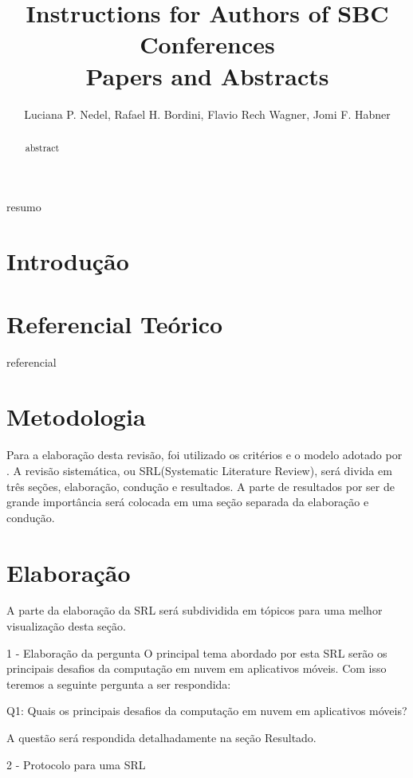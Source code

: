 \documentclass[12pt]{article}
\title{Instructions for Authors of SBC Conferences\\ Papers and Abstracts}
\author{Luciana P. Nedel\inst{1}, Rafael H. Bordini\inst{2}, Flavio Rech
  Wagner\inst{1}, Jomi F. Habner\inst{3} }
\begin{document}
 

\maketitle

\begin{abstract}
  abstract
\end{abstract}
     
\begin{resumo} 
  resumo
\end{resumo}


\section{Introdução}

\lipsum[1]

\section{Referencial Teórico}

  referencial

\section{Metodologia}

Para a elaboração desta revisão, foi utilizado os critérios e o modelo adotado por \cite{kitchenham2012}. A revisão sistemática, ou SRL(Systematic Literature Review), será divida em três seções, elaboração, condução e resultados. A parte de resultados por ser de grande importância será colocada em uma seção separada da elaboração e condução.

\section{Elaboração}
A parte da elaboração da SRL será subdividida em tópicos para uma melhor visualização desta seção.

1 - Elaboração da pergunta
O principal tema abordado por esta SRL serão os principais desafios da computação em nuvem em aplicativos móveis. Com isso teremos a seguinte pergunta a ser respondida:

Q1: Quais os principais desafios da computação em nuvem em aplicativos móveis?

A questão será respondida detalhadamente na seção Resultado.

2 - Protocolo para uma SRL
\end{document}
